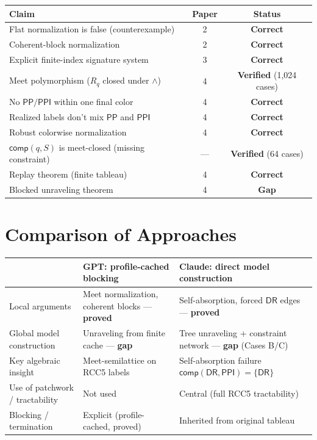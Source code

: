 \documentclass[a4paper,11pt]{article}
\theoremstyle{definition}
\newcommand{\DR}{\ensuremath{\mathsf{DR}}}
\newcommand{\PP}{\ensuremath{\mathsf{PP}}}
\newcommand{\PPI}{\ensuremath{\mathsf{PPI}}}
\newcommand{\comp}{\ensuremath{\mathsf{comp}}}
\begin{document}
\begin{center}
\renewcommand{\arraystretch}{1.25}
\begin{tabular}{@{}lcc@{}}
\toprule
\textbf{Claim} & \textbf{Paper} & \textbf{Status} \\
\midrule
Flat normalization is false (counterexample) & 2 & \textbf{Correct} \\
Coherent-block normalization & 2 & \textbf{Correct} \\
Explicit finite-index signature system & 3 & \textbf{Correct} \\
Meet polymorphism ($R_q$ closed under $\wedge$) & 4 &
  \textbf{Verified} (1,024 cases) \\
No $\PP/\PPI$ within one final color & 4 & \textbf{Correct} \\
Realized labels don't mix $\PP$ and $\PPI$ & 4 & \textbf{Correct} \\
Robust colorwise normalization & 4 & \textbf{Correct} \\
$\comp(q,S)$ is meet-closed (missing constraint) & --- &
  \textbf{Verified} (64 cases) \\
Replay theorem (finite tableau) & 4 & \textbf{Correct} \\
\midrule
Blocked unraveling theorem & 4 & \textbf{Gap} \\
\bottomrule
\end{tabular}
\end{center}


\section{Comparison of Approaches}
\label{sec:comparison}

\begin{center}
\renewcommand{\arraystretch}{1.25}
\begin{tabular}{@{}p{4.2cm}p{4.8cm}p{4.8cm}@{}}
\toprule
& \textbf{GPT: profile-cached blocking}
& \textbf{Claude: direct model construction} \\
\midrule
Local arguments
& Meet normalization, coherent blocks --- \textbf{proved}
& Self-absorption, forced $\DR$ edges --- \textbf{proved} \\[3pt]
Global model construction
& Unraveling from finite cache --- \textbf{gap}
& Tree unraveling + constraint network --- \textbf{gap} (Cases B/C) \\[3pt]
Key algebraic insight
& Meet-semilattice on RCC5 labels
& Self-absorption failure $\comp(\DR,\PPI) = \{\DR\}$ \\[3pt]
Use of patchwork / tractability
& Not used
& Central (full RCC5 tractability) \\[3pt]
Blocking / termination
& Explicit (profile-cached, proved)
& Inherited from original tableau \\
\bottomrule
\end{tabular}
\end{center}
\end{document}
